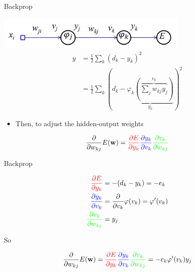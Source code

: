 \documentclass[notes]{beamer}
\providecommand{\tightlist}{%
  \setlength{\itemsep}{0pt}\setlength{\parskip}{0pt}}
\begin{document}
\begin{frame}{Backprop}

\centering 

\includegraphics[width=0.70000\textwidth]{2018-03-10-13-49-42.png}\\

\begin{align} 
    y & = \frac{1}{2} \sum_k (d_k - y_k)^2 \\ %
      & =  \frac{1}{2}\sum_k \left(
        d_k - \underbrace{\varphi_k 
        \left( \overbrace{\sum_j w_{kj} y_j}^{v_k} \right)
         }_{y_k}
      \right)^2 
\end{align}

\begin{itemize}
\tightlist
\item
  Then, to adjust the hidden-output weights
\end{itemize}

\begin{equation}
    \frac{\partial }{\partial w_{kj}} E(\mathbf{w}) = 
    \textcolor{red}{
        \frac{\partial E}{\partial y_k}} 
    \textcolor{blue}{
        \frac{\partial y_k}{\partial v_k}
    } 
    \textcolor{green}{
        \frac{\partial v_k}{\partial w_{kj}}
    }
\end{equation}

\end{frame}

\begin{frame}{Backprop}

\begin{align}
    \textcolor{red}{
    \frac{\partial E}{\partial y_k}} & = -(d_k - y_k) = -e_k                                           \\
    \textcolor{blue}{
        \frac{\partial y_k}{\partial v_k}
    }                                & = \frac{\partial }{\partial v_k} \varphi (v_k) = \varphi ' (v_k) \\
    \textcolor{green}{
        \frac{\partial v_k}{\partial w_{kj}}
    }                                & = y_j
\end{align}

So

\begin{equation}
  \frac{\partial }{\partial w_{kj}} E(\mathbf{w}) = 
    \textcolor{red}{
        \frac{\partial E}{\partial y_k}} 
    \textcolor{blue}{
        \frac{\partial y_k}{\partial v_k}
    } 
    \textcolor{green}{
        \frac{\partial v_k}{\partial w_{kj}}
    } = -e_k \varphi ' (v_k) y_j 
\end{equation}

\end{frame}
\end{document}
